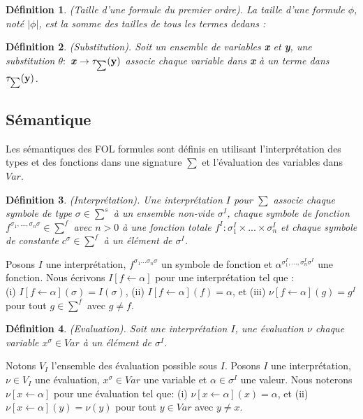 \documentclass[9pt]{book}
\newtheorem{definition}{D\'efinition}[section]
\begin{document}
\begin{definition}
(Taille d'une formule du premier ordre). La taille d'une formule $\phi$, not\'e $|\phi|$, est la somme des tailles de tous les termes dedans :
\end{definition}

\begin{definition}
(Substitution). Soit un ensemble de variables \textbf{x} et \textbf{y}, une substitution $\theta :$ \textbf{x} $\rightarrow \tau_{\mathsmaller\sum}(\textbf{y})$ associe chaque variable dans \textbf{x} \`a un terme dans $\tau_{\mathsmaller\sum}(\textbf{y})$.
\end{definition}
	\subsection{S\'emantique}
	Les s\'emantiques des FOL formules sont d\'efinis en utilisant l'interpr\'etation des types et des fonctions dans une signature $\sum$ et l'\'evaluation des variables dans $Var$.
\begin{definition}
(Interpr\'etation). Une interpr\'etation $I$ pour $\sum$ associe chaque symbole de type $\sigma \in \sum^{s}$ \`a un ensemble non-vide $\sigma^{I}$, chaque symbole de fonction $f^{\sigma_{1},...,\sigma_{n}\sigma} \in \sum^{f}$ avec $n > 0$ \`a une fonction totale $f^{I} : \sigma_{1}^{I}\times ... \times \sigma_{n}^{I}$ et chaque symbole de constante $c^{\sigma} \in \sum^{f}$ \`a un \'el\'ement de $\sigma^{I}$.
\end{definition}
	Posons $I$ une interpr\'etation, $f^{\sigma_{1} ...\sigma_{n} \sigma}$ un symbole de fonction et $\alpha^{\sigma_{1}^{I},...,\sigma_{n}^{I}\sigma^{I}}$ une fonction. Nous \'ecrivons $I[f \leftarrow \alpha]$ pour une interpr\'etation tel que : \\(i) $I[f\leftarrow\alpha](\sigma) = I(\sigma)$, (ii) $I[f\leftarrow\alpha](f) = \alpha$, et (iii) $\nu[f\leftarrow\alpha](g) = g^{I}$ pour tout $g \in \sum^{f}$ avec $g\neq f$.
	
\begin{definition}
(Evaluation). Soit une interpr\'etation $I$, une \'evaluation $\nu$ chaque variable $x^{\sigma} \in Var$ \`a un \'el\'ement de $\sigma^{I}$.
\end{definition}
Notons $V_{I}$ l'ensemble des \'evaluation possible sous $I$.
Posons $I$ une interpr\'etation, $\nu \in V_{I}$ une \'evaluation, $x^{\sigma} \in Var$ une variable et $\alpha \in \sigma^{I}$ une valeur. Nous noterons $\nu[x\leftarrow\alpha]$ pour une \'evaluation tel que: (i) $\nu[x\leftarrow\alpha](x) = \alpha$, et (ii) $\nu[x\leftarrow\alpha](y)=\nu(y)$ pour tout $y\in Var$ avec $y\neq x$.
\end{document}
